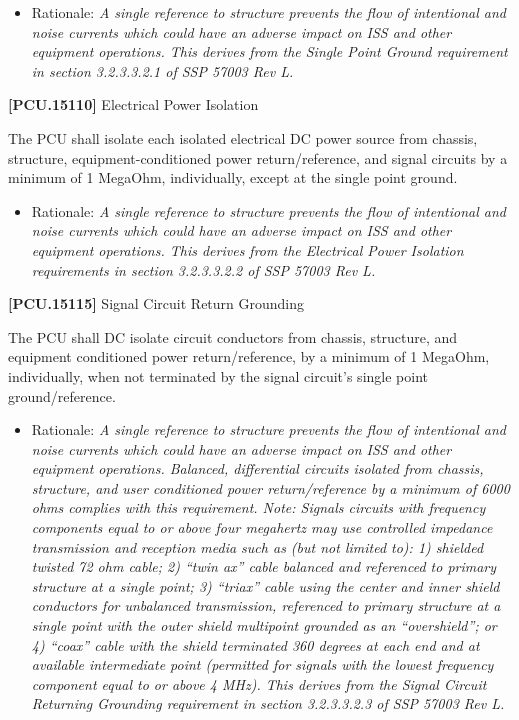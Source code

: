 \begin{itemize}
\item{} Rationale: \emph{A single reference to structure prevents the flow of intentional and noise currents which could have an adverse impact on ISS and other equipment operations. This derives from the Single Point Ground requirement in section 3.2.3.3.2.1 of SSP 57003 Rev L.}

\end{itemize}

\textbf{[PCU.15110]} Electrical Power Isolation

The \gls{PCU} shall isolate each isolated electrical DC power source from chassis, structure, equipment-conditioned power return\slash reference, and signal circuits by a minimum of 1 MegaOhm, individually, except at the single point ground.

\begin{itemize}
\item{} Rationale: \emph{A single reference to structure prevents the flow of intentional and noise currents which could have an adverse impact on ISS and other equipment operations. This derives from the Electrical Power Isolation requirements in section 3.2.3.3.2.2 of SSP 57003 Rev L.}

\end{itemize}

\textbf{[PCU.15115]} Signal Circuit Return Grounding

The \gls{PCU} shall DC isolate circuit conductors from chassis, structure, and equipment conditioned power return\slash reference, by a minimum of 1 MegaOhm, individually, when not terminated by the signal circuit's single point ground\slash reference.

\begin{itemize}
\item{} Rationale: \emph{A single reference to structure prevents the flow of intentional and noise currents which could have an adverse impact on ISS and other equipment operations. Balanced, differential circuits isolated from chassis, structure, and user conditioned power return\slash reference by a minimum of 6000 ohms complies with this requirement. Note: Signals circuits with frequency components equal to or above four megahertz may use controlled impedance transmission and reception media such as (but not limited to): 1) shielded twisted 72 ohm cable; 2) ``twin ax'' cable balanced and referenced to primary structure at a single point; 3) ``triax'' cable using the center and inner shield conductors for unbalanced transmission, referenced to primary structure at a single point with the outer shield multipoint grounded as an ``overshield''; or 4) ``coax'' cable with the shield terminated 360 degrees at each end and at available intermediate point (permitted for signals with the lowest frequency component equal to or above 4 MHz). This derives from the Signal Circuit Returning Grounding requirement in section 3.2.3.3.2.3 of SSP 57003 Rev L.}

\end{itemize}


